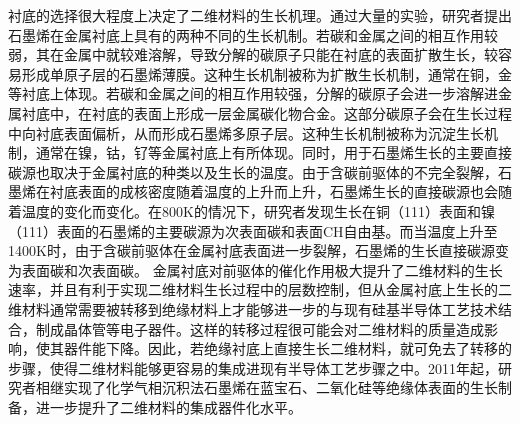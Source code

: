     衬底的选择很大程度上决定了二维材料的生长机理。通过大量的实验，研究者提出石墨烯在金属衬底上具有的两种不同的生长机制。若碳和金属之间的相互作用较弱，其在金属中就较难溶解，导致分解的碳原子只能在衬底的表面扩散生长，较容易形成单原子层的石墨烯薄膜。这种生长机制被称为扩散生长机制，通常在铜，金等衬底上体现。若碳和金属之间的相互作用较强，分解的碳原子会进一步溶解进金属衬底中，在衬底的表面上形成一层金属碳化物合金。这部分碳原子会在生长过程中向衬底表面偏析，从而形成石墨烯多原子层。这种生长机制被称为沉淀生长机制，通常在镍，钴，钌等金属衬底上有所体现。同时，用于石墨烯生长的主要直接碳源也取决于金属衬底的种类以及生长的温度。由于含碳前驱体的不完全裂解，石墨烯在衬底表面的成核密度随着温度的上升而上升，石墨烯生长的直接碳源也会随着温度的变化而变化。在800K的情况下，研究者发现生长在铜（111）表面和镍（111）表面的石墨烯的主要碳源为次表面碳和表面CH自由基。而当温度上升至1400K时，由于含碳前驱体在金属衬底表面进一步裂解，石墨烯的生长直接碳源变为表面碳和次表面碳。
    金属衬底对前驱体的催化作用极大提升了二维材料的生长速率，并且有利于实现二维材料生长过程中的层数控制，但从金属衬底上生长的二维材料通常需要被转移到绝缘材料上才能够进一步的与现有硅基半导体工艺技术结合，制成晶体管等电子器件。这样的转移过程很可能会对二维材料的质量造成影响，使其器件能下降。因此，若绝缘衬底上直接生长二维材料，就可免去了转移的步骤，使得二维材料能够更容易的集成进现有半导体工艺步骤之中。2011年起，研究者相继实现了化学气相沉积法石墨烯在蓝宝石、二氧化硅等绝缘体表面的生长制备，进一步提升了二维材料的集成器件化水平。

